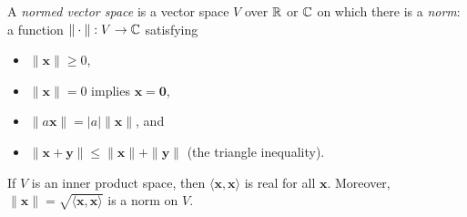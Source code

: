 \begin{defn}
  A \emph{normed vector space} is a vector space $V$ over $\mathbb{R}$ or $\mathbb{C}$
  on which there is a \emph{norm}: a function $\|\cdot\|:V\to\mathbb{C}$ satisfying
  \begin{itemize}
    \item $\|\mathbf x\|\ge 0$,
    \item $\|\mathbf x\|=0$ implies $\mathbf x=\mathbf 0$,
    \item $\|a\mathbf x\|=|a|\|\mathbf x\|$, and
    \item $\|\mathbf x+\mathbf y\|\le\|\mathbf x\|+\|\mathbf y\|$ (the triangle
      inequality).
  \end{itemize}
\end{defn}
\begin{prop}
  If $V$ is an inner product space, then $\langle\mathbf x,\mathbf x\rangle$ is
  real for all $\mathbf x$.
  Moreover, $\|\mathbf x\|=\sqrt{\langle\mathbf x,\mathbf x\rangle}$ is a norm
  on $V$.
\end{prop}
